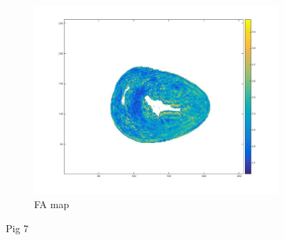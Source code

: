 \begin{figure}[h!]
\begin{subfigure}{.31\textwidth}
        \includegraphics[width=\textwidth]{figures/pig7_fa_14}
        \caption{FA map}
        \label{fig:pig7_fa}
    \end{subfigure}
    \caption{Pig 7}
    \label{fig:pig7}
    

\end{figure}
